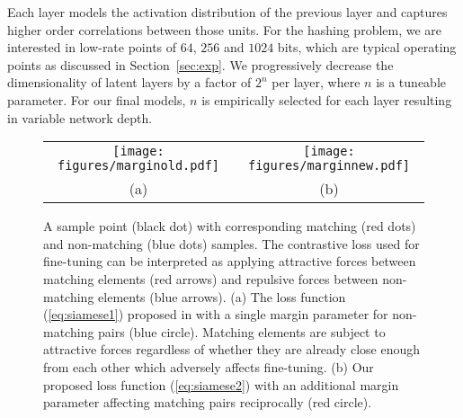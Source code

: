 \documentclass[10pt,twocolumn,letterpaper]{article}
\begin{document}
Each layer models the activation distribution of the previous layer and captures higher order correlations between those units. 
For the hashing problem, we are interested in low-rate points of $64$, $256$ and $1024$ bits, which are typical operating points as discussed in Section~\ref{sec:exp}. 
We progressively decrease the dimensionality of latent layers by a factor of $2^{n}$ per layer, where $n$ is a tuneable parameter.
For our final models, $n$ is empirically selected for each layer resulting in variable network depth.






\begin{figure}
	\centering %
		\begin{tabular}{@{}c@{} @{}c@{}}
			\texttt{[image: figures/marginold.pdf]} &
			\texttt{[image: figures/marginnew.pdf]} \\
			(a) & (b)
		\end{tabular}
		\caption{\footnotesize A sample point (black dot) with corresponding matching (red dots) and non-matching (blue dots) samples.
The contrastive loss used for fine-tuning can be interpreted as applying attractive forces between matching elements (red arrows) and repulsive forces between non-matching elements (blue arrows).
(a) The loss function (\ref{eq:siamese1}) proposed in \cite{Siamese} with a single margin parameter for non-matching pairs (blue circle). Matching elements are subject to attractive forces regardless of whether they are already close enough from each other which adversely affects fine-tuning.
(b) Our proposed loss function (\ref{eq:siamese2}) with an additional margin parameter affecting matching pairs reciprocally (red circle).}
	\label{fig:margin1}
\end{figure}
\end{document}
